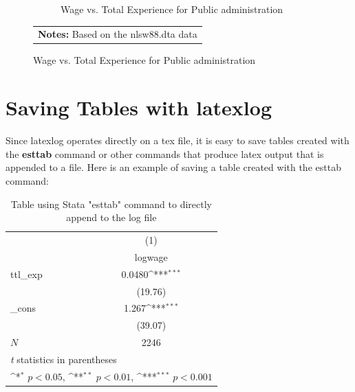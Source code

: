 \documentclass{article}
\begin{document}
\begin{figure}[H]
\begin{subfigure}{.3\textwidth}
  \caption{Wage vs. Total Experience for Public administration}
\end{subfigure}
\begin{tabular}{p{6in}}  
 \footnotesize 
 \textbf{Notes:} Based on the nlsw88.dta data 
\end{tabular} 
\end{figure} 
\clearpage\pagebreak
\section{Saving Tables with latexlog}
Since latexlog operates directly on a tex file, it is easy to save 
tables created with the \textbf{esttab} command or other commands that 
produce latex output that is appended to a file.
Here is an example of saving a table created with the esttab command:
 
\vspace{10pt}
\begin{table}[htbp]\centering
\def\sym#1{\ifmmode^{#1}\else\(^{#1}\)\fi}
\caption{Table using Stata "esttab" command to directly append to the log file}
\begin{tabular}{l*{1}{c}}
\toprule
            &\multicolumn{1}{c}{(1)}\\
            &\multicolumn{1}{c}{logwage}\\
\midrule
ttl\_exp     &      0.0480\sym{***}\\
            &     (19.76)         \\
\addlinespace
\_cons      &       1.267\sym{***}\\
            &     (39.07)         \\
\midrule
\(N\)       &        2246         \\
\bottomrule
\multicolumn{2}{l}{\footnotesize \textit{t} statistics in parentheses}\\
\multicolumn{2}{l}{\footnotesize \sym{*} \(p<0.05\), \sym{**} \(p<0.01\), \sym{***} \(p<0.001\)}\\
\end{tabular}
\end{table}
\end{document}
